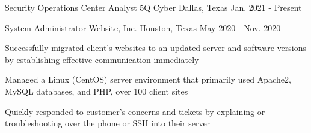     \begin{cventries}
    
      \cventry
        {Security Operations Center Analyst} %
        {5Q Cyber} %
        {Dallas, Texas} %
        {Jan. 2021 - Present} %
        {
          \begin{cvitems}
            \item {}
            \item {}
            \item {}
          \end{cvitems}
        }


      \cventry
        {System Administrator} %
        {Website, Inc.} %
        {Houston, Texas} %
        {May 2020 - Nov. 2020} %
        {
          \begin{cvitems}
            \item {Successfully migrated client's websites to an updated server and software versions by establishing effective communication immediately}
            \item {Managed a Linux (CentOS) server environment that primarily used Apache2, MySQL databases, and PHP, over 100 client sites}
            \item {Quickly responded to customer's concerns and tickets by explaining or troubleshooting over the phone or SSH into their server}
          \end{cvitems}
        }
  \end{cventries}
